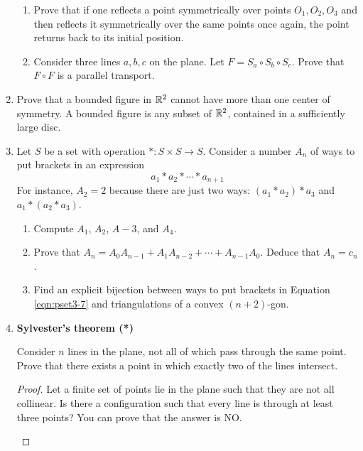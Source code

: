 \documentclass[../apprentice.tex]{subfiles}
\begin{document}
\begin{enumerate}
\begin{enumerate}
        \item Prove that if one reflects a point symmetrically over points $O_1,O_2,O_3$ and then reflects it symmetrically over the same points once again, the point returns back to its initial position.
        \item Consider three lines $a,b,c$ on the plane. Let $F=S_a\circ S_b\circ S_c$. Prove that $F\circ F$ is a parallel transport.
    \end{enumerate}
    \item Prove that a bounded figure in $\mathbb{R}^2$ cannot have more than one center of symmetry. A bounded figure is any subset of $\mathbb{R}^2$, contained in a sufficiently large disc.
    \item Let $S$ be a set with operation $*:S\times S\to S$. Consider a number $A_n$ of ways to put brackets in an expression
    \begin{equation}\label{eqn:pset3-7}
        a_1*a_2*\cdots*a_{n+1}
    \end{equation}
    For instance, $A_2=2$ because there are just two ways: $(a_1*a_2)*a_3$ and $a_1*(a_2*a_3)$.
    \begin{enumerate}
        \item Compute $A_1$, $A_2$, $A-3$, and $A_4$.
        \item Prove that $A_n=A_0A_{n-1}+A_1A_{n-2}+\cdots+A_{n-1}A_0$. Deduce that $A_n=c_n$.
        \item Find an explicit bijection between ways to put brackets in Equation \ref{eqn:pset3-7} and triangulations of a convex $(n+2)$-gon.
    \end{enumerate}
    \item \textbf{Sylvester's theorem (*)}\par
    Consider $n$ lines in the plane, not all of which pass through the same point. Prove that there exists a point in which exactly two of the lines intersect.
    \begin{proof}
        Let a finite set of points lie in the plane such that they are not all collinear. Is there a configuration such that every line is through at least three points? You can prove that the answer is NO.\par
        \begin{figure}[h!]
            \centering
\end{figure}
\end{proof}
\end{enumerate}
\end{document}

